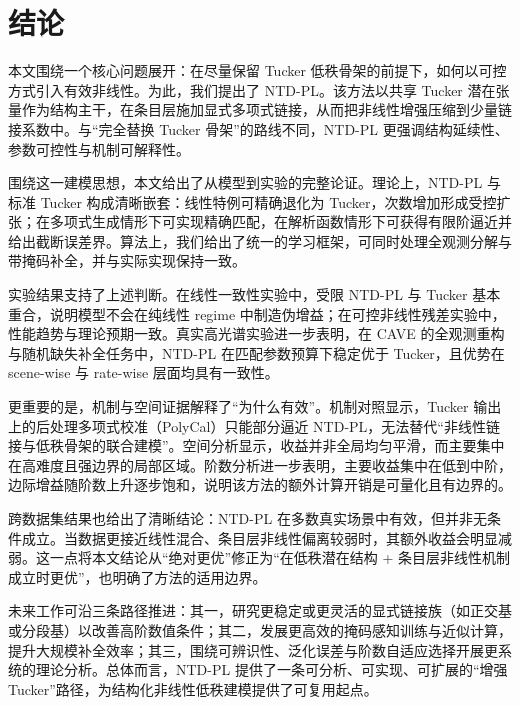 \section{结论}

本文围绕一个核心问题展开：在尽量保留 Tucker 低秩骨架的前提下，如何以可控方式引入有效非线性。为此，我们提出了 NTD-PL。该方法以共享 Tucker 潜在张量作为结构主干，在条目层施加显式多项式链接，从而把非线性增强压缩到少量链接系数中。与“完全替换 Tucker 骨架”的路线不同，NTD-PL 更强调结构延续性、参数可控性与机制可解释性。

围绕这一建模思想，本文给出了从模型到实验的完整论证。理论上，NTD-PL 与标准 Tucker 构成清晰嵌套：线性特例可精确退化为 Tucker，次数增加形成受控扩张；在多项式生成情形下可实现精确匹配，在解析函数情形下可获得有限阶逼近并给出截断误差界。算法上，我们给出了统一的学习框架，可同时处理全观测分解与带掩码补全，并与实际实现保持一致。

实验结果支持了上述判断。在线性一致性实验中，受限 NTD-PL 与 Tucker 基本重合，说明模型不会在纯线性 regime 中制造伪增益；在可控非线性残差实验中，性能趋势与理论预期一致。真实高光谱实验进一步表明，在 CAVE 的全观测重构与随机缺失补全任务中，NTD-PL 在匹配参数预算下稳定优于 Tucker，且优势在 scene-wise 与 rate-wise 层面均具有一致性。

更重要的是，机制与空间证据解释了“为什么有效”。机制对照显示，Tucker 输出上的后处理多项式校准（PolyCal）只能部分逼近 NTD-PL，无法替代“非线性链接与低秩骨架的联合建模”。空间分析显示，收益并非全局均匀平滑，而主要集中在高难度且强边界的局部区域。阶数分析进一步表明，主要收益集中在低到中阶，边际增益随阶数上升逐步饱和，说明该方法的额外计算开销是可量化且有边界的。

跨数据集结果也给出了清晰结论：NTD-PL 在多数真实场景中有效，但并非无条件成立。当数据更接近线性混合、条目层非线性偏离较弱时，其额外收益会明显减弱。这一点将本文结论从“绝对更优”修正为“在低秩潜在结构 + 条目层非线性机制成立时更优”，也明确了方法的适用边界。

未来工作可沿三条路径推进：其一，研究更稳定或更灵活的显式链接族（如正交基或分段基）以改善高阶数值条件；其二，发展更高效的掩码感知训练与近似计算，提升大规模补全效率；其三，围绕可辨识性、泛化误差与阶数自适应选择开展更系统的理论分析。总体而言，NTD-PL 提供了一条可分析、可实现、可扩展的“增强 Tucker”路径，为结构化非线性低秩建模提供了可复用起点。
